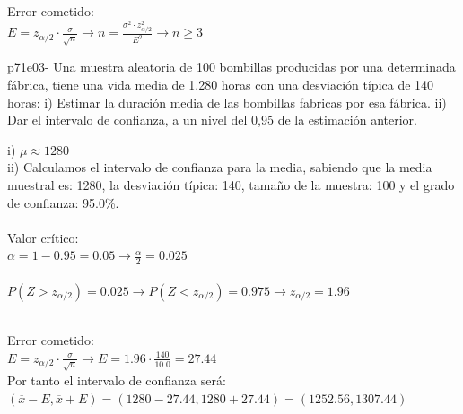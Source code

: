 \documentclass[spanish, 11pt]{exam}
\begin{document}
\begin{questions}
\begin{solution}
    Error cometido: \\ $E=z_{\alpha/2}\cdot \frac{\sigma}{\sqrt{n}} \to n =\frac{\sigma^2 \cdot z_{\alpha / 2}^2}{E^2} \to n \geq3$ \\    \end{solution}\question p71e03- Una muestra aleatoria de 100 bombillas producidas por una determinada fábrica, tiene una vida media de
1.280 horas con una desviación típica de 140 horas:
i) Estimar la duración media de las bombillas fabricas por esa fábrica.
ii) Dar el intervalo de confianza, a un nivel del 0,95 de la estimación anterior. \begin{solution}   i) $\mu\approx 1280$ \\ ii) Calculamos el intervalo de confianza para la media, sabiendo que la media muestral es: 1280, la desviación típica: 140, tamaño de la muestra: 100 y el grado de confianza: 95.0\%. \\ \\ Valor crítico: \\ $\alpha=1-0.95=0.05\to \frac{\alpha}{2}=0.025$ \\ \\ $P(Z>z_{\alpha/2})=0.025\to P(Z<z_{\alpha/2})=0.975 \to z_{\alpha/2} =1.96$ \\ 
     \\
    Error cometido: \\ $E=z_{\alpha/2}\cdot \frac{\sigma}{\sqrt{n}} \to E=1.96\cdot \frac{140}{10.0}=27.44$ \\ Por tanto el intervalo de confianza será: \\$\left(\overline{x} - E , \overline{x} + E \right)=\left(1280 - 27.44 , 1280 + 27.44 \right)=\left(1252.56, 1307.44 \right)$ \\  \\ 

\end{solution}
\end{questions}
\end{document}
